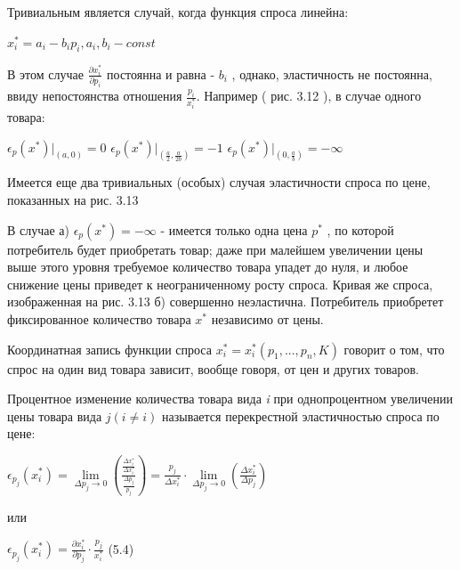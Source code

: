 \documentclass[12pt, 4paper]{book}
\begin{document}
{Тривиальным является случай, когда функция спроса линейна: 
\begin{center}
$x_{i}^{*} = a_i - b_i p_i, a_i,b_i - const$
\end{center}
\par

В этом случае  $\frac{\partial x_{i}^{*}}{\partial p_i}$ постоянна и равна - $b_i$ , однако, эластичность не постоянна, ввиду непостоянства отношения $\frac{p_i}{x_{i}^{*}}$. Например ( рис. 3.12 ),
в случае одного товара: 
\begin{center}
$\epsilon_p(x^{*})|_{(a,0)}=0$
$\epsilon_p(x^{*})|_{(\frac{a}{2},\frac{a}{2b})}=-1$
$\epsilon_p(x^{*})|_{(0,\frac{a}{b})}=- \infty$
\end{center}
\par

Имеется еще два тривиальных (особых) случая эластичности спроса по цене, показанных на рис. 3.13 
\par

В случае а) $\epsilon_p (x^{*}) = -\infty $ - имеется только одна цена $p^{*}$ , по которой потребитель будет приобретать товар; даже при малейшем увеличении цены выше этого уровня требуемое количество товара упадет до нуля, и любое снижение цены приведет к неограниченному росту спроса. Кривая же спроса, изображенная на рис. 3.13 б) совершенно неэластична. Потребитель приобретет фиксированное количество товара $x^{*}$ независимо от цены. 
\par

Координатная запись функции спроса $x_{i}^{*}=x_{i}^{*}(p_1,...,p_n,K)$ говорит о том, что спрос на один вид товара зависит, вообще говоря, от цен и других товаров. 
\par

Процентное изменение количества товара вида \textit{i} при однопроцентном увеличении цены товара вида $j (i \neq i)$  называется перекрестной эластичностью спроса по цене: 
\begin{center}
$\epsilon_{p_{j}} (x_{i}^{*})=\lim\limits_{\Delta p_j \rightarrow 0}(\frac{\frac{\Delta x_{i}^{*}}{\Delta x_{i}^{*}}}{\frac{\Delta p_j}{p_j}})=\frac{p_j}{\Delta x_{i}^{*}} \cdot \lim \limits_{\Delta p_j \rightarrow 0}(\frac{\Delta x_{i}^{*}}{\Delta p_j}) $
\end{center}
или
\begin{center}
$\epsilon_{p_{j}} (x_{i}^{*})=\frac{\partial x_{i}^{*}}{\partial p_j} \cdot \frac{p_j}{x_{i}^{*}}$ (5.4)
\end{center}
\par

}
\end{document}
